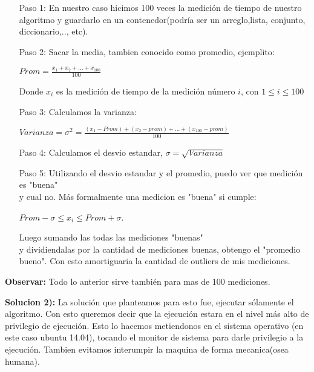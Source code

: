 \begin{itemize}
	\item[Paso 1:] En nuestro caso hicimos 100 veces la medición de tiempo de nuestro algoritmo y guardarlo en un contenedor(podría ser un arreglo,lista, conjunto, diccionario,.., etc).
	\item[Paso 2:] Sacar la media, tambien conocido como promedio, ejemplito:
		\begin{center} $ Prom =\frac{x_1+x_2+...+x_{100}}{100}$ \end{center}
		Donde $x_i$ es la medición de tiempo de la medición número $i$, con $1 \leq i \leq 100$ 
	\item[Paso 3:] Calculamos la varianza: 			
				\begin{center}
					$Varianza = \sigma^2 = \frac{(x_1 - Prom)+ (x_2 - prom)+ ...+ (x_{100} - prom)}{100} $
				\end{center}
	\item[Paso 4:] Calculamos el desvio estandar,  $\sigma = \sqrt{Varianza}$
	\item[Paso 5:] Utilizando el desvio estandar y el promedio, puedo ver que medición es "buena"  \\ y cual no. Más formalmente una medicion es "buena" si cumple: 
					\begin{center}
					$Prom - \sigma \leq x_i \leq Prom + \sigma $. %
					\end{center}
	 Luego sumando las todas las mediciones  "buenas" \\ y dividiendalas por la cantidad de mediciones buenas, obtengo el "promedio bueno". Con esto amortiguaria la cantidad de outliers de mis mediciones. 			
\end{itemize}

\textbf{Observar:} Todo lo anterior sirve también para mas de 100 mediciones. \newline

\textbf{Solucion 2):} La solución que planteamos para esto fue, ejecutar sólamente el algoritmo. Con esto queremos decir que la ejecución estara en el nivel más alto de privilegio de ejecución. Esto lo hacemos metiendonos en el sistema operativo (en este caso ubuntu 14.04), tocando el monitor de sistema para darle privilegio a la ejecución. Tambien evitamos interumpir la maquina de forma mecanica(osea humana).  
